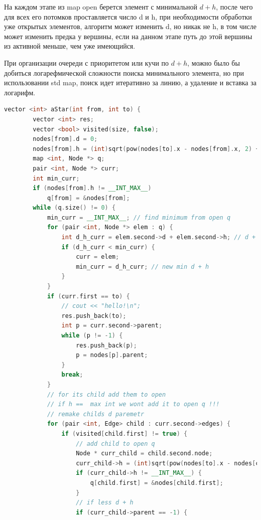 На каждом этапе из map open берется элемент с минимальной $d + h$, после чего для всех его потомков проставляется число d и h, при необходимости обработки уже открытых элементов, алгоритм может изменить d, но никак не h, в том числе может изменить предка у вершины, если на данном этапе путь до этой вершины из активной меньше, чем уже имеющийся.

При организации очереди с приоритетом или кучи по $d + h$, можно было бы добиться логарефмической сложности поиска минимального элемента, но при использовании std map, поиск идет итеративно за линию, а удаление и вставка за логарифм.



\begin{lstlisting}[language=C++]
vector <int> aStar(int from, int to) {
        vector <int> res;
        vector <bool> visited(size, false);
        nodes[from].d = 0;
        nodes[from].h = (int)sqrt(pow(nodes[to].x - nodes[from].x, 2) + pow(nodes[to].y - nodes[from].y, 2));
        map <int, Node *> q;
        pair <int, Node *> curr;
        int min_curr;
        if (nodes[from].h != __INT_MAX__)
            q[from] = &nodes[from];
        while (q.size() != 0) {
            min_curr = __INT_MAX__; // find minimum from open q
            for (pair <int, Node *> elem : q) {
                int d_h_curr = elem.second->d + elem.second->h; // d + h of some in q
                if (d_h_curr < min_curr) {
                    curr = elem;
                    min_curr = d_h_curr; // new min d + h
                }
            }
            if (curr.first == to) {
                // cout << "hello!\n";
                res.push_back(to);
                int p = curr.second->parent;
                while (p != -1) {
                    res.push_back(p);
                    p = nodes[p].parent;
                }
                break;
            }
            // for its child add them to open
            // if h ==  max int we wont add it to open q !!!
            // remake childs d paremetr
            for (pair <int, Edge> child : curr.second->edges) {
                if (visited[child.first] != true) {
                    // add child to open q
                    Node * curr_child = child.second.node;
                    curr_child->h = (int)sqrt(pow(nodes[to].x - nodes[child.first].x, 2) + pow(nodes[to].y - nodes[child.first].y, 2));
                    if (curr_child->h != __INT_MAX__) {
                        q[child.first] = &nodes[child.first];
                    }
                    // if less d + h
                    if (curr_child->parent == -1) {

\end{lstlisting}
